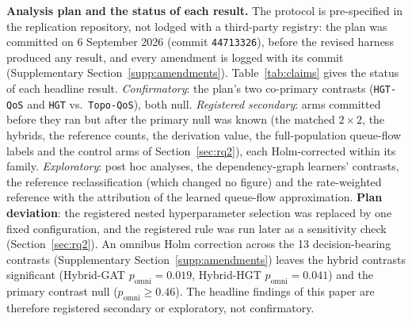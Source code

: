\documentclass[preprint,3p]{elsarticle}
\begin{document}
\noindent\textbf{Analysis plan and the status of each result.} The protocol is pre-specified in the replication repository, not lodged with a third-party registry: the plan was committed on 6 September 2026 (commit \texttt{44713326}), before the revised harness produced any result, and every amendment is logged with its commit (Supplementary Section~\ref{supp:amendments}). Table~\ref{tab:claims} gives the status of each headline result. \emph{Confirmatory}: the plan's two co-primary contrasts (\texttt{HGT-QoS} and \texttt{HGT} vs.\ \texttt{Topo-QoS}), both null. \emph{Registered secondary}: arms committed before they ran but after the primary null was known (the matched $2\times2$, the hybrids, the reference counts, the derivation value, the full-population queue-flow labels and the control arms of Section~\ref{sec:rq2}), each Holm-corrected within its family. \emph{Exploratory}: post hoc analyses, the dependency-graph learners' contrasts, the reference reclassification (which changed no figure) and the rate-weighted reference with the attribution of the learned queue-flow approximation. \textbf{Plan deviation}: the registered nested hyperparameter selection was replaced by one fixed configuration, and the registered rule was run later as a sensitivity check (Section~\ref{sec:rq2}). An omnibus Holm correction across the 13 decision-bearing contrasts (Supplementary Section~\ref{supp:amendments}) leaves the hybrid contrasts significant (Hybrid-GAT $p_{\text{omni}} = 0.019$, Hybrid-HGT $p_{\text{omni}} = 0.041$) and the primary contrast null ($p_{\text{omni}} \ge 0.46$). The headline findings of this paper are therefore registered secondary or exploratory, not confirmatory.
\end{document}
